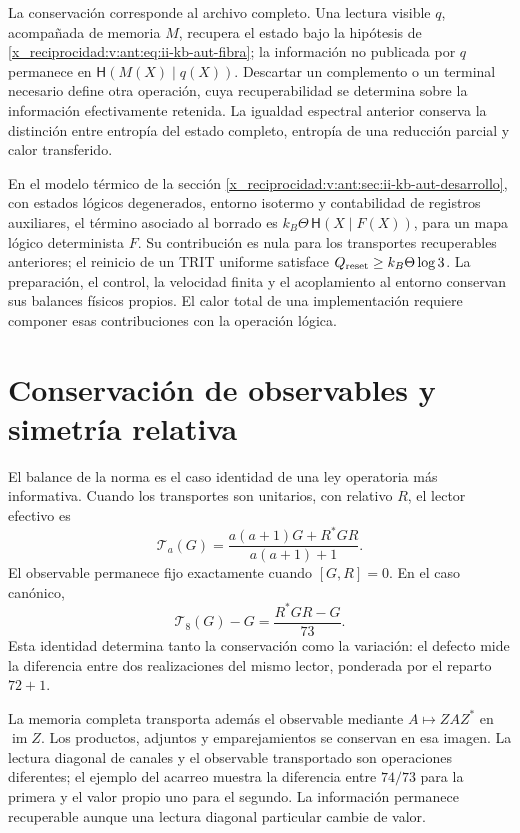 La conservación corresponde al archivo completo. Una lectura visible
\(q\), acompañada de memoria \(M\), recupera el estado bajo la
hipótesis de \eqref{x_reciprocidad:v:ant:eq:ii-kb-aut-fibra}; la información no
publicada por \(q\) permanece en
\(\mathsf H(M(X)\mid q(X))\). Descartar un complemento o un
terminal necesario define otra operación, cuya recuperabilidad se
determina sobre la información efectivamente retenida. La igualdad
espectral anterior conserva la distinción entre entropía del estado
completo, entropía de una reducción parcial y calor transferido.

En el modelo térmico de la sección
\ref{x_reciprocidad:v:ant:sec:ii-kb-aut-desarrollo}, con estados lógicos degenerados,
entorno isotermo y contabilidad de registros auxiliares, el término
asociado al borrado es
\(k_B\Theta\,\mathsf H(X\mid F(X))\), para un mapa lógico
determinista \(F\). Su contribución es nula para los transportes
recuperables anteriores; el reinicio de un TRIT uniforme satisface
\(Q_{\rm reset}\geq k_B\Theta\log3\). La preparación, el control,
la velocidad finita y el acoplamiento al entorno conservan sus
balances físicos propios. El calor total de una implementación
requiere componer esas contribuciones con la operación lógica.

\section{Conservación de observables y simetría relativa}
\label{x_reciprocidad:lib06:simetria}

El balance de la norma es el caso identidad de una ley operatoria
más informativa. Cuando los transportes son unitarios, con relativo
\(R\), el lector efectivo es
\begin{equation}
 \mathcal T_a(G)=\frac{a(a+1)G+R^*GR}{a(a+1)+1}.
 \label{x_reciprocidad:lib06:lector}
\end{equation}
El observable permanece fijo exactamente cuando \([G,R]=0\).
En el caso canónico,
\begin{equation}
 \mathcal T_8(G)-G=\frac{R^*GR-G}{73}.
 \label{x_reciprocidad:lib06:defecto-lector}
\end{equation}
Esta identidad determina tanto la conservación como la variación:
el defecto mide la diferencia entre dos realizaciones del mismo
lector, ponderada por el reparto \(72+1\).

La memoria completa transporta además el observable mediante
\(A\mapsto ZAZ^*\) en \(\operatorname{im}Z\). Los productos,
adjuntos y emparejamientos se conservan en esa imagen. La lectura
diagonal de canales y el observable transportado son operaciones
diferentes; el ejemplo del acarreo muestra la diferencia entre
\(74/73\) para la primera y el valor propio uno para el segundo.
La información permanece recuperable aunque una lectura diagonal
particular cambie de valor.

